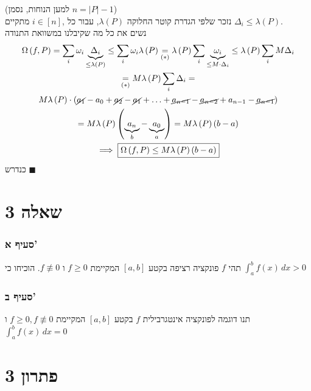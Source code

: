 \documentclass[12pt, titlepage]{article}
\begin{document}
(למען הנוחות, נסמן $n=\left| P \right|-1$)\\
נזכר שלפי הגדרת קוטר החלוקה $\lambda \left( P \right)$, עבור כל ,$i\in \left[ n \right]$ מתקיים $\Delta_{i}\leq\lambda \left( P \right)$.\\
נשים את כל מה שקיבלנו במשוואת התנודה
\begin{gather*}
	\Omega \left( f,P \right) = \sum_{i} \omega_{i}\underbrace{ \Delta_{i} }_{ \leq \lambda \left( P \right)  } \leq \sum_{i}\omega_{i}\lambda \left( P \right)  \underset{ \left( * \right)  }{ = } \lambda \left( P \right) \sum_{i}\underbrace{ \omega_{i} }_{ \leq M\cdot\Delta_{i} }\leq\lambda \left( P \right) \sum_{i}M\Delta_{i} \\
	\underset{ \left( * \right)  }{ = }M\lambda \left( P \right) \sum_{i}\Delta_{i}= \\
	 M\lambda \left( P \right) \cdot \left( \cancel{a_{1}}-a_{0}+\cancel{a_{2}}-\cancel{a_{1}}+\ldots+\cancel{a_{n-1}}-\cancel{a_{n-2}}+a_{n-1}-\cancel{a_{n-1}} \right) \\
	 = M\lambda \left( P \right) \left( \underbrace{ a_{n} }_{ b }-\underbrace{ a_{0} }_{ a } \right) = M\lambda \left( P \right) \left( b-a \right)  \\ 
	 \implies \boxed{\Omega \left( f,P \right) \leq M\lambda \left( P \right) \left( b-a \right) }
\end{gather*}
כנדרש
$\blacksquare$
\part*{שאלה 3}
\section*{סעיף א'}
תהי $f$ פונקציה רציפה בקטע $\left[ a,b \right]$ המקיימת $f\geq 0$ ו $f\not\equiv 0$. הוכיחו כי $\int_{a}^{b} f\left( x \right) \, dx>0$ 
\section*{סעיף ב'}
תנו דוגמה לפונקציה אינטגרבילית $f$ בקטע $\left[ a,b \right]$ המקיימת $f\geq 0,f\not\equiv 0$ ו \\
$\int_{a}^{b} f\left( x \right) \, dx=0$
\part*{פתרון 3}
\end{document}
